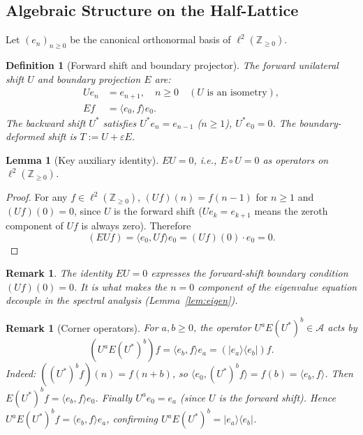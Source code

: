 \documentclass[10pt]{amsart}
\newcommand{\1}{{\mathbb{I}}}
\newtheorem{lemma}[theorem]{Lemma}
\newtheorem{remark}[theorem]{Remark}
\newtheorem{definition}[theorem]{Definition}
\numberwithin{equation}{section}
\begin{document}
\subsection{Algebraic Structure on the Half-Lattice}
\label{sec:shift-structure}

Let $(e_n)_{n\ge0}$ be the canonical orthonormal basis of $\ell^2(\mathbb{Z}_{\ge 0})$.

\begin{definition}[Forward shift and boundary projector]\label{def:shift}
The \emph{forward unilateral shift} $U$ and boundary projection $E$ are:
\begin{align*}
U e_n &= e_{n+1}, \quad n \ge 0 \quad (U \text{ is an isometry}), \\
Ef &= \langle e_0, f \rangle e_0.
\end{align*}
The backward shift $U^*$ satisfies $U^* e_n = e_{n-1}$ ($n \ge 1$), $U^* e_0 = 0$.
The boundary-deformed shift is $T := U + \varepsilon E$.
\end{definition}

\begin{lemma}[Key auxiliary identity]\label{lem:EU-zero}
$EU = 0$, i.e., $E \circ U = 0$ as operators on $\ell^2(\mathbb{Z}_{\ge 0})$.
\end{lemma}

\begin{proof}
For any $f \in \ell^2(\mathbb{Z}_{\ge 0})$, $(Uf)(n) = f(n-1)$ for $n \ge 1$ and
$(Uf)(0) = 0$, since $U$ is the forward shift ($Ue_k = e_{k+1}$ means the zeroth component
of $Uf$ is always zero). Therefore
\[
(EUf) = \langle e_0, Uf \rangle e_0 = (Uf)(0) \cdot e_0 = 0.
\]
\end{proof}

\begin{remark}
The identity $EU = 0$ expresses the forward-shift boundary condition $(Uf)(0)=0$. It is what
makes the $n=0$ component of the eigenvalue equation decouple in the spectral analysis
(Lemma~\ref{lem:eigen}).
\end{remark}

\begin{remark}[Corner operators]\label{rem:corner}
For $a, b \ge 0$, the operator $U^a E (U^*)^b \in \mathcal{A}$ acts by
\[
(U^a E (U^*)^b) f = \langle e_b, f \rangle e_a = (|e_a\rangle\langle e_b|) f.
\]
Indeed: $((U^*)^b f)(n) = f(n+b)$, so $\langle e_0, (U^*)^b f\rangle = f(b) =
\langle e_b, f\rangle$. Then $E(U^*)^b f = \langle e_b, f\rangle e_0$.
Finally $U^a e_0 = e_a$ (since $U$ is the forward shift). Hence
$U^a E (U^*)^b f = \langle e_b, f\rangle e_a$, confirming $U^a E (U^*)^b = |e_a\rangle\langle e_b|$.
\end{remark}
\end{document}

